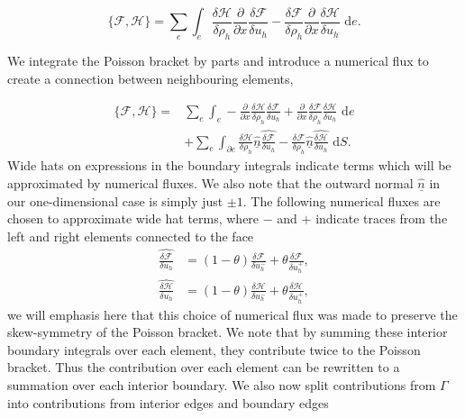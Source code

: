 \documentclass[a4paper,11pt]{article}
\begin{document}
\[ \{ \mathcal{F},  \mathcal{H}\} = \sum_e \int_e \frac{\delta  \mathcal{H}}{\delta \rho_h} \frac{\partial}{\partial x}\frac{\delta  \mathcal{F}}{\delta u_h} - \frac{\delta  \mathcal{F}}{\delta \rho_h} \frac{\partial}{\partial x}\frac{\delta  \mathcal{H}}{\delta u_h} \text{ d}e.\]

 We integrate the  Poisson bracket by parts and introduce a numerical flux to create a connection between neighbouring elements,

\begin{equation}
\begin{aligned}
 \{ \mathcal{F},  \mathcal{H}\} = & \sum_e \int_e - \frac{\partial}{\partial x}\frac{\delta  \mathcal{H}}{\delta \rho_h} \frac{\delta  \mathcal{F}}{\delta u_h} + \frac{\partial}{\partial x}\frac{\delta  \mathcal{F}}{\delta \rho_h}\frac{\delta  \mathcal{H}}{\delta u_h} \text{ d}e \\
 &+ \sum_e \int_{\partial e }  \frac{\delta  \mathcal{H}}{\delta \rho_h}\hat{\underline{n}} \widehat{\frac{\delta  \mathcal{F}}{\delta u_h}} - \frac{\delta  \mathcal{F}}{\delta \rho_h}\hat{\underline{n}} \widehat{\frac{\delta  \mathcal{H}}{\delta u_h}} \text{ d} S. 
 \end{aligned}
 \end{equation}
 Wide hats on expressions in the boundary integrals indicate terms which will be approximated by numerical fluxes. We also note that the outward normal $\hat{\underline{n}}$ in our one-dimensional case is simply just $\pm 1$.
  The  following numerical fluxes are chosen to approximate wide hat terms, where $-$  and $+$ indicate traces from the left and right elements connected to the face
 \begin{equation}
 \begin{aligned}
  \widehat{\frac{\delta  \mathcal{F}}{\delta u_h}} &= (1-\theta) \frac{\delta  \mathcal{F}}{\delta u_h^-}+ \theta\frac{\delta  \mathcal{F}}{\delta u_h^+},  \\
 \widehat{\frac{\delta  \mathcal{H}}{\delta u_h}}&= (1-\theta) \frac{\delta  \mathcal{H}}{\delta u_h^-}+ \theta\frac{\delta  \mathcal{H}}{\delta u_h^+} ,
 \end{aligned}
 \end{equation}
 we will emphasis here that this choice of numerical flux was made to preserve the skew-symmetry of the Poisson bracket.  We note that by summing these interior boundary integrals over each element, they contribute twice to the Poisson bracket. Thus the contribution over each element can be rewritten to a summation over each interior boundary. We also now split contributions from $\Gamma$ into contributions from interior edges and boundary edges
\end{document}
